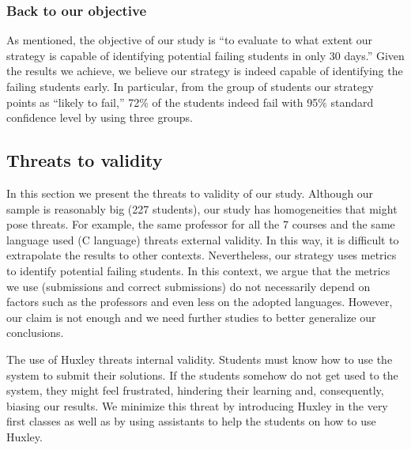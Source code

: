 \subsubsection{Back to our objective}

As mentioned, the objective of our study is ``to evaluate to what extent our strategy is capable of identifying potential failing students in only 30 days.'' Given the results we achieve, we believe our strategy is indeed capable of identifying the failing students early. In particular, from the group of students our strategy points as ``likely to fail,'' 72\% of the students indeed fail with 95\% standard confidence level by using three groups. 


\subsection{Threats to validity}

In this section we present the threats to validity of our study. Although our sample is reasonably big (227 students), our study has homogeneities that might pose threats. For example, the same professor for all the 7 courses and the same language used (C language) threats external validity. In this way, it is difficult to extrapolate the results to other contexts. Nevertheless, our strategy uses metrics to identify potential failing students. In this context, we argue that the metrics we use (submissions and correct submissions) do not necessarily depend on factors such as the professors and even less on the adopted languages. However, our claim is not enough and we need further studies to better generalize our conclusions.

The use of Huxley threats internal validity. Students must know how to use the system to submit their solutions. If the students somehow do not get used to the system, they might feel frustrated, hindering their learning and, consequently, biasing our results. We minimize this threat by introducing Huxley in the very first classes as well as by using assistants to help the students on how to use Huxley.
